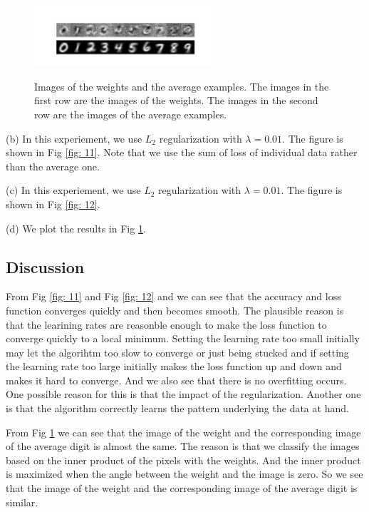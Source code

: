 \documentclass{article} %
\begin{document}
\begin{figure}[t]
	\centering	
	\includegraphics[width=2.6in,height=1.2in]{../softmax/figs/image_of_weights_and_digits.png} 
	\caption{Images of the weights and the average examples. The images in the first row are the images of the weights. The images in the second row are the images of the average examples.}
	\label{fig: 13}
\end{figure}

(b) In this experiement, we use $L_2$ regularization with $\lambda = 0.01$. The figure is shown in Fig \ref{fig: 11}. Note that we use the sum of loss of individual data rather than the average one.


(c) In this experiement, we use $L_2$ regularization with $\lambda = 0.01$. The figure is shown in Fig \ref{fig: 12}.

(d) We plot the results in Fig \ref{fig: 13}.


\subsection{Discussion}
From Fig \ref{fig: 11} and Fig \ref{fig: 12} and we can see that the accuracy and loss function converges quickly and then becomes smooth. The plausible reason is that the learining rates are reasonble enough to make the loss function to converge quickly to a local minimum. Setting the learning rate too small initially may let the algorihtm too slow to converge or just being stucked and if setting the learning rate too large initially makes the loss function up and down and makes it hard to converge. And we also see that there is no overfitting occurs. One possible reason for this is that the impact of the regularization. Another one is that the algorithm correctly learns the pattern underlying the data at hand.

From Fig \ref{fig: 13} we can see that the image of the weight and the corresponding image of the average digit is almost the same. The reason is that we classify the images based on the inner product of the pixels with the weights. And the inner product is maximized when the angle between the weight and the image is zero. So we see that the image of the weight and the corresponding image of the average digit is similar.
\end{document}
